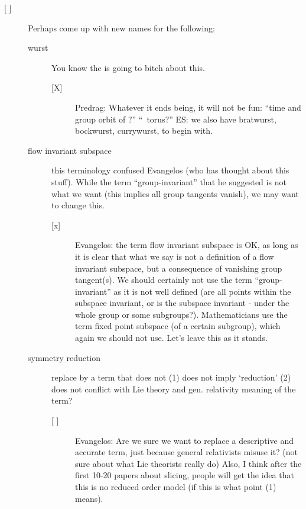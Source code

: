 \begin{description}
\begin{description}
\item[{[ ]}] Perhaps come up with new names for the following:
	\begin{description}
	\item[wurst] You know the
                  is going to bitch about this.
		\begin{description}
			\item[{[X]}] Predrag: Whatever it ends being, it will not be
                    fun: ``time and group orbit of \ssp?'' ``\rpo\ torus?''
					{ES: we also have bratwurst, bockwurst, currywurst, to
					begin with.}
		 \end{description}
	\item[flow invariant subspace] this terminology confused Evangelos (who has thought about this stuff). While the term ``group-invariant'' that he suggested is not what we want (this implies all group tangents vanish), we may want to change this.
	  \begin{description}
	   \item[{[x]}] Evangelos: the term flow invariant subspace is OK,
	    as long as it is clear that what we say is not a definition
	    of a flow invariant subspace, but a consequence of vanishing group
	    tangent(s). We should certainly not use the term ``group-invariant''
	    as it is not well defined (are all points within the subspace
	    invariant, or is the subspace invariant - under the whole group or
	    some subgroups?). Mathematicians use the term
	    fixed point subspace (of a certain subgroup), which again we should
	    not use. Let's leave this as it stands.
	   \end{description}
	\item[symmetry reduction] replace by a term that does not (1) does not imply `reduction' (2) does not conflict with Lie theory and gen. relativity meaning of the term?
	  \begin{description}
	   \item[{[ ]}] Evangelos: Are we sure we want to replace
	    a descriptive and accurate term, just because general relativists
	    misuse it? (not sure about what Lie theorists really do)
	    Also, I think after the first 10-20 papers about slicing, people
	    will get the idea that this is no reduced order model (if this
	    is what point (1) means).
	  \end{description}
	\end{description}
	

\end{description}
\end{description}
